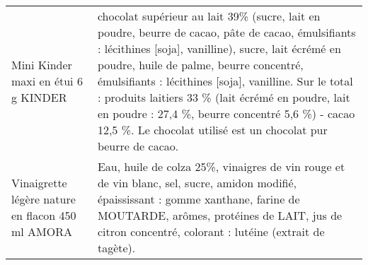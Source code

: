 \begin{longtable}{p{5cm}p{10cm}}
                                                                      Mini Kinder maxi en étui 6 g KINDER &                                                                                                                                                                                                                                                                                                                                                                                                                                                                                                                                                                                               chocolat supérieur au lait 39\% (sucre, lait en poudre, beurre de cacao, pâte de cacao, émulsifiants : lécithines [soja], vanilline), sucre, lait écrémé en poudre, huile de palme, beurre concentré, émulsifiants : lécithines [soja], vanilline.  Sur le total : produits laitiers 33 \% (lait écrémé en poudre, lait en poudre : 27,4 \%, beurre concentré 5,6 \%) - cacao 12,5 \%. Le chocolat utilisé est un chocolat pur beurre de cacao. \\
                                                         Vinaigrette légère nature en flacon 450 ml AMORA &                                                                                                                                                                                                                                                                                                                                                                                                                                                                                                                                                                                                                                                                                                                                                                                              Eau, huile de colza 25\%, vinaigres de vin rouge et de vin blanc, sel, sucre, amidon modifié, épaississant : gomme xanthane, farine de MOUTARDE, arômes, protéines de LAIT, jus de citron concentré, colorant : lutéine (extrait de tagète). \\

\end{longtable}
